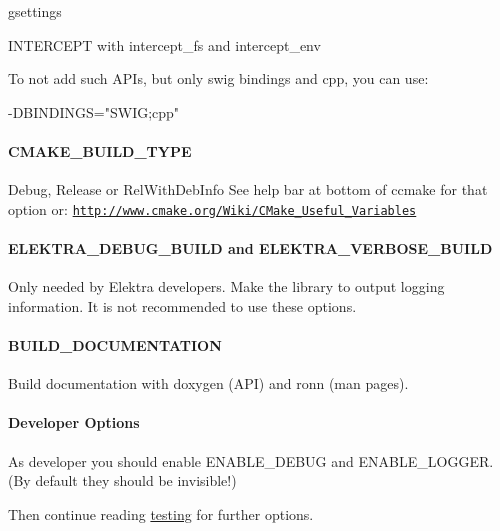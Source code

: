 \begin{DoxyItemize}
\item {\ttfamily gsettings}
\item {\ttfamily I\+N\+T\+E\+R\+C\+E\+P\+T} with {\ttfamily intercept\+\_\+fs} and {\ttfamily intercept\+\_\+env}
\end{DoxyItemize}

To not add such A\+P\+Is, but only {\ttfamily swig} bindings and {\ttfamily cpp}, you can use\+: \begin{DoxyVerb}-DBINDINGS="SWIG;cpp"
\end{DoxyVerb}


\paragraph*{C\+M\+A\+K\+E\+\_\+\+B\+U\+I\+L\+D\+\_\+\+T\+Y\+P\+E}

{\ttfamily Debug}, {\ttfamily Release} or {\ttfamily Rel\+With\+Deb\+Info} See help bar at bottom of ccmake for that option or\+: \href{http://www.cmake.org/Wiki/CMake_Useful_Variables}{\tt http\+://www.\+cmake.\+org/\+Wiki/\+C\+Make\+\_\+\+Useful\+\_\+\+Variables}

\paragraph*{E\+L\+E\+K\+T\+R\+A\+\_\+\+D\+E\+B\+U\+G\+\_\+\+B\+U\+I\+L\+D and E\+L\+E\+K\+T\+R\+A\+\_\+\+V\+E\+R\+B\+O\+S\+E\+\_\+\+B\+U\+I\+L\+D}

Only needed by Elektra developers. Make the library to output logging information. It is not recommended to use these options.

\paragraph*{B\+U\+I\+L\+D\+\_\+\+D\+O\+C\+U\+M\+E\+N\+T\+A\+T\+I\+O\+N}

Build documentation with doxygen (A\+P\+I) and ronn (man pages).

\paragraph*{Developer Options}

As developer you should enable {\ttfamily E\+N\+A\+B\+L\+E\+\_\+\+D\+E\+B\+U\+G} and {\ttfamily E\+N\+A\+B\+L\+E\+\_\+\+L\+O\+G\+G\+E\+R}. (By default they should be invisible!)

Then continue reading \hyperlink{doc_TESTING_md}{testing} for further options.

